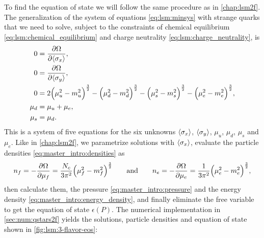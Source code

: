 To find the equation of state we will follow the same procedure as in \cref{chap:lsm2f}.
The generalization of the system of equations \eqref{eq:lsm:minsys} with strange quarks that we need to solve,
subject to the constraints of chemical equilibrium \eqref{eq:lsm:chemical_equilibrium} and charge neutrality \eqref{eq:lsm:charge_neutrality},
is
\begin{subequations}
\begin{align}
	0 &= \pdv{\Omega}{ \langle \sigma_x \rangle} , \label{eq:lsm3f:minsys_minx} \\
	0 &= \pdv{\Omega}{ \langle \sigma_y \rangle} , \label{eq:lsm3f:minsys_miny} \\
	0 &= 2 \Big(\mu_u^2-m_u^2\Big)^\frac32 - \Big(\mu_d^2-m_d^2\Big)^\frac32 - \Big(\mu_s^2-m_s^2\Big)^\frac32 - \Big(\mu_e^2-m_e^2\Big)^\frac32 \label{eq:lsm:minsys3f_charge}, \\
	\mu_d &= \mu_u + \mu_e, \\
	\mu_s &= \mu_d .
\end{align}%
\label{eq:lsm3f:minsys}%
\end{subequations}%
This is a system of five equations for the six unknowns
$\langle \sigma_x \rangle$, $\langle \sigma_y \rangle$, $\mu_u$, $\mu_d$, $\mu_s$ and $\mu_e$.
Like in \cref{chap:lsm2f},
we parametrize solutions with $\langle \sigma_x \rangle$,
evaluate the particle densities \eqref{eq:master_intro:densities} as
\begin{equation}
	n_f = -\pdv{\Omega}{\mu_f} = \frac{N_c}{3 \pi^2} \Big( \mu_f^2 - m_f^2 \Big)^{\frac32}
	\qquad \text{and} \qquad
	n_e = -\pdv{\Omega}{\mu_e} = \frac{  1}{3 \pi^2} \Big( \mu_e^2 - m_e^2 \Big)^{\frac32},
\label{eq:lsm3f:particle_densities}
\end{equation}%
then calculate them, the pressure \eqref{eq:master_intro:pressure} and the energy density \eqref{eq:master_intro:energy_density},
and finally eliminate the free variable to get the equation of state $\epsilon(P)$.
The numerical implementation in \cref{sec:num:qstars2f} yields
the solutions, particle densities and equation of state shown in \cref{fig:lsm:3-flavor-eos}:
